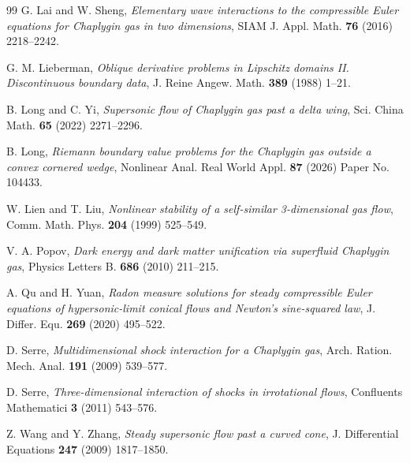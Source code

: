 \documentclass[reqno,12pt]{amsart}
\numberwithin{equation}{section}
\begin{document}
\begin{thebibliography}{99}
 G. Lai and W. Sheng, {\it Elementary wave interactions to the compressible {E}uler equations for Chaplygin gas in two dimensions}, SIAM J. Appl. Math. {\bf 76} (2016) 2218--2242.

 G. M. Lieberman, {\it Oblique derivative problems in {L}ipschitz domains {II}. {D}iscontinuous boundary data}, J. Reine Angew. Math. {\bf 389} (1988) 1--21.

 B. Long and C. Yi, {\it Supersonic flow of {C}haplygin gas past a delta wing}, Sci. China Math. {\bf 65} (2022) 2271--2296.

 B. Long, {\it Riemann boundary value problems for the Chaplygin gas outside a convex cornered wedge}, Nonlinear Anal. Real World Appl. {\bf 87} (2026) Paper No. 104433.

 W. Lien and T. Liu, {\it Nonlinear stability of a self-similar 3-dimensional gas flow}, Comm. Math. Phys. {\bf 204} (1999) 525--549.

 V. A. Popov, {\it Dark energy and dark matter unification via superfluid {C}haplygin gas}, Physics Letters B. {\bf 686} (2010) 211--215.

 A. Qu and H. Yuan, {\it Radon measure solutions for steady compressible Euler equations of hypersonic-limit conical flows and Newton’s sine-squared law}, J. Differ. Equ. {\bf 269} (2020) 495--522.

 D. Serre, {\it Multidimensional shock interaction for a {C}haplygin gas}, Arch. Ration. Mech. Anal. {\bf 191} (2009) 539--577.

 D. Serre, {\it Three-dimensional interaction of shocks in irrotational flows}, Confluents Mathematici {\bf 3} (2011) 543--576.

 Z. Wang and Y. Zhang, {\it Steady supersonic flow past a curved cone}, J. Differential Equations {\bf 247} (2009) 1817--1850.

\end{thebibliography}
\end{document}
